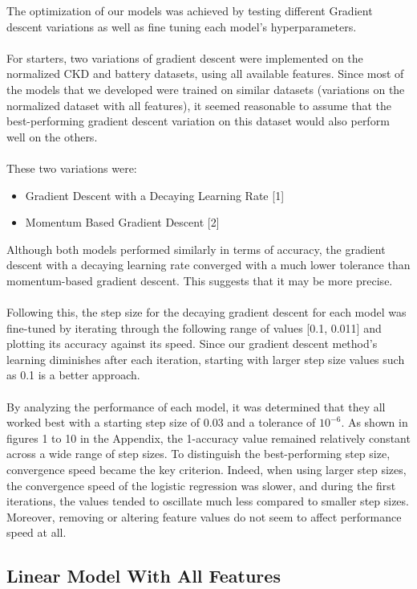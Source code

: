 \documentclass{article}
\begin{document}
The optimization of our models was achieved by testing different Gradient descent variations as well as fine tuning each model’s hyperparameters.  
\\
\\
For starters, two variations of gradient descent were implemented on the normalized CKD and battery datasets, using all available features. Since most of the models that we developed were trained on similar datasets (variations on the normalized dataset with all features), it seemed reasonable to assume that the best-performing gradient descent variation on this dataset would also perform well on the others. 
\\
\\
These two variations were: 
\begin{itemize}
  \item Gradient Descent with a Decaying Learning Rate [1]
  \item Momentum Based Gradient Descent [2]  
\end{itemize}
Although both models performed similarly in terms of accuracy, the gradient descent with a decaying learning rate converged with a much lower tolerance than momentum-based gradient descent. This suggests that it may be more precise. 
\\
\\
Following this, the step size for the decaying gradient descent for each model was fine-tuned by iterating through the following range of values [0.1, 0.011] and plotting its accuracy against its speed. Since our gradient descent method’s learning diminishes after each iteration, starting with larger step size values such as 0.1 is a better approach.  
\\
\\
By analyzing the performance of each model, it was determined that they all worked best with a starting step size of 0.03 and a tolerance of $10^{-6}$. As shown in figures 1 to 10 in the Appendix, the 1-accuracy value remained relatively constant across a wide range of step sizes. To distinguish the best-performing step size, convergence speed became the key criterion.  Indeed, when using larger step sizes, the convergence speed of the logistic regression was slower, and during the first iterations, the values tended to oscillate much less compared to smaller step sizes. Moreover, removing or altering feature values do not seem to affect performance speed at all. 

\subsection{Linear Model With All Features}
\end{document}
